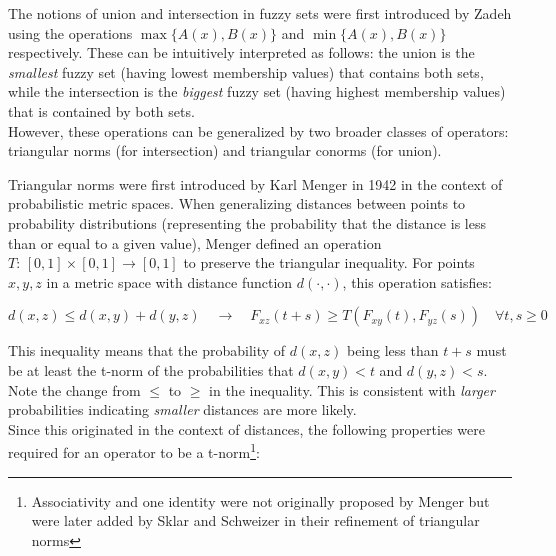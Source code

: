 
The notions of union and intersection in fuzzy sets were first introduced by Zadeh \cite{Zadeh1965} using the operations $\max\{A(x),B(x)\}$ and $\min\{A(x),B(x)\}$ respectively. These can be intuitively interpreted as follows: the union is the \textit{smallest} fuzzy set (having lowest membership values) that contains both sets, while the intersection is the \textit{biggest} fuzzy set (having highest membership values) that is contained by both sets.\\

However, these operations can be generalized by two broader classes of operators: triangular norms (for intersection) and triangular conorms (for union).

Triangular norms were first introduced by Karl Menger in 1942 \cite{OriginTNorms} in the context of probabilistic metric spaces. When generalizing distances between points to probability distributions (representing the probability that the distance is less than or equal to a given value), Menger defined an operation $T:\,[0,1]\times [0,1]\to [0,1]$ to preserve the triangular inequality. For points $x,y,z$ in a metric space with distance function $d(\cdot,\cdot)$, this operation satisfies:

\begin{equation}\label{eq:Ftriangle_inequality}
d(x, z) \leq d(x, y) + d(y, z) \quad \longrightarrow \quad F_{xz}(t + s) \geq T(F_{xy}(t), F_{yz}(s)) \quad \forall t,s \geq 0
\end{equation}

This inequality means that the probability of $d(x,z)$ being less than $t+s$ must be at least the t-norm of the probabilities that $d(x,y)<t$ and $d(y,z)<s$. Note the change from $\leq$ to $\geq$ in the inequality. This is consistent with \textit{larger} probabilities indicating \textit{smaller} distances are more likely.\\

Since this originated in the context of distances, the following properties were required for an operator to be a t-norm\footnote{Associativity and one identity were not originally proposed by Menger but were later added by Sklar and Schweizer \cite{Sklar1983} in their refinement of triangular norms}:

